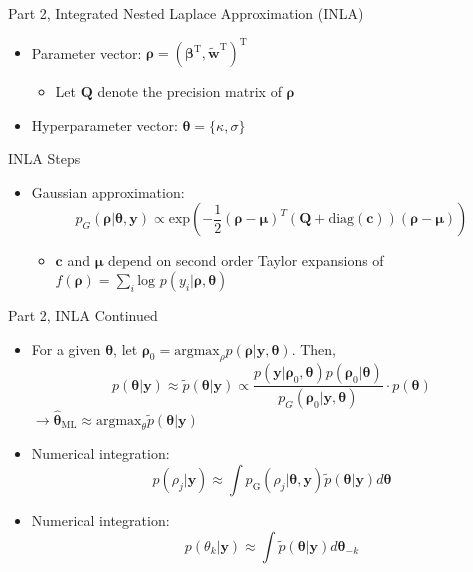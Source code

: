 \documentclass{beamer}
\begin{document}
\begin{frame}{Part 2, Integrated Nested Laplace Approximation (INLA) \citep{Rue2009}}

\begin{itemize}
\addtolength{\itemsep}{0.5\baselineskip}
\item Parameter vector: $\pmb{\rho} = ( \pmb{\beta}^{\text{T}}, \widetilde{\pmb{w}}^{\text{T}} )^{\text{T}}$
            \begin{itemize}
            \addtolength{\itemsep}{0.5\baselineskip}
            \item Let $\pmb{Q}$ denote the precision matrix of $\pmb{\rho}$
            \end{itemize}
\item Hyperparameter vector: $\pmb{\theta} = \{\kappa, \sigma \}$
\end{itemize}
INLA Steps
\begin{itemize}
\item Gaussian approximation:
$$ p_{G}(\pmb{\rho}|\pmb{\theta}, \pmb{y}) \propto \text{exp} \left( -\frac{1}{2}(\pmb{\rho-\mu})^{T} (\pmb{Q} + \text{diag}(\pmb{c}) ) (\pmb{\rho - \mu}) \right) $$
              \begin{itemize}
              \item $\pmb{c}$ and $\pmb{\mu}$ depend on second order Taylor expansions of $f(\pmb{\rho}) = \sum_{i} \text{log }p(y_{i}|\pmb{\rho},\pmb{\theta})$
              \end{itemize}
\end{itemize}
\end{frame}


\begin{frame}{Part 2, INLA \citep{Rue2009}}{Continued}
\begin{itemize}
\addtolength{\itemsep}{0.5\baselineskip}
\item For a given $\pmb{\theta}$, let $\pmb{\rho}_{0} = \text{argmax}_{\rho}p(\pmb{\rho}|\pmb{y},\pmb{\theta})$. Then,
$$  p(\pmb{\theta}|\pmb{y}) \approx \tilde{p}(\pmb{\theta}|\pmb{y}) \propto  \frac{p(\pmb{y} | \pmb{\rho}_{0}, \pmb{\theta}) p(\pmb{\rho}_{0} | \pmb{\theta})}{p_{G}(\pmb{\rho}_{0} | \pmb{y}, \pmb{\theta})} \cdot p(\pmb{\theta}) $$
$\longrightarrow \hat{\pmb{\theta}}_{\text{ML}} \approx \text{argmax}_{\theta} \tilde{p}(\pmb{\theta}|\pmb{y})$
\item Numerical integration: 
        $$ p(\rho_{j} | \pmb{y}) \approx \int p_{\text{G}}(\rho_{j}|\pmb{\theta, y})\tilde{p}(\pmb{\theta}|\pmb{y}) d\pmb{\theta} $$
\item Numerical integration: 
$$ p(\theta_{k} | \pmb{y}) \approx \int \tilde{p}(\pmb{\theta}|\pmb{y}) d\pmb{\theta}_{-k} $$
\end{itemize}

\end{frame}
\end{document}
